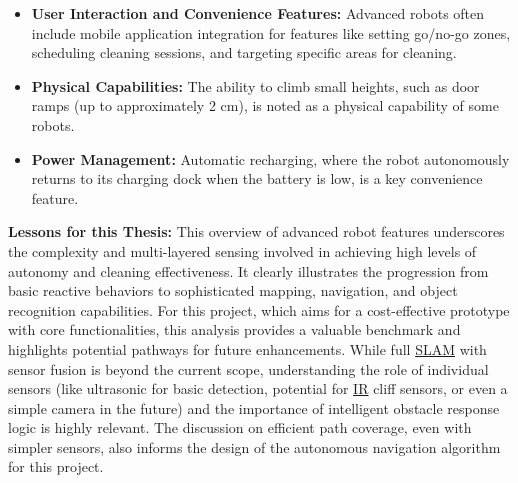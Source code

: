 \begin{itemize}
\begin{itemize}
            \item \textbf{Detecting Small or Low-Lying Obstacles:} 2D \hyperref[term:lidar]{LiDAR} can also miss small or flat obstacles on the floor, such as wires, clothes, or pet waste. To address this, a camera, often combined with an inbuilt 3D depth sensor, is added to the front. This system maps the immediate frontal region in 3D, enabling precise detection and avoidance of such objects.
            \item \textbf{Sensor Fusion:} The video highlights the Sensor Fusion technique, which involves combining data from multiple sensor types (e.g., \hyperref[term:lidar]{LiDAR} and camera systems) to achieve more accurate and robust environmental perception and cleaning paths.
        \end{itemize}
    \item \textbf{User Interaction and Convenience Features:} Advanced robots often include mobile application integration for features like setting go/no-go zones, scheduling cleaning sessions, and targeting specific areas for cleaning.
    \item \textbf{Physical Capabilities:} The ability to climb small heights, such as door ramps (up to approximately 2 cm), is noted as a physical capability of some robots.
    \item \textbf{Power Management:} Automatic recharging, where the robot autonomously returns to its charging dock when the battery is low, is a key convenience feature.
\end{itemize}
\textbf{Lessons for this Thesis:} This overview of advanced robot features underscores the complexity and multi-layered sensing involved in achieving high levels of autonomy and cleaning effectiveness. It clearly illustrates the progression from basic reactive behaviors to sophisticated mapping, navigation, and object recognition capabilities. For this project, which aims for a cost-effective prototype with core functionalities, this analysis provides a valuable benchmark and highlights potential pathways for future enhancements. While full \hyperref[term:slam]{SLAM} with sensor fusion is beyond the current scope, understanding the role of individual sensors (like ultrasonic for basic detection, potential for \hyperref[term:ir]{IR} cliff sensors, or even a simple camera in the future) and the importance of intelligent obstacle response logic is highly relevant. The discussion on efficient path coverage, even with simpler sensors, also informs the design of the autonomous navigation algorithm for this project.
